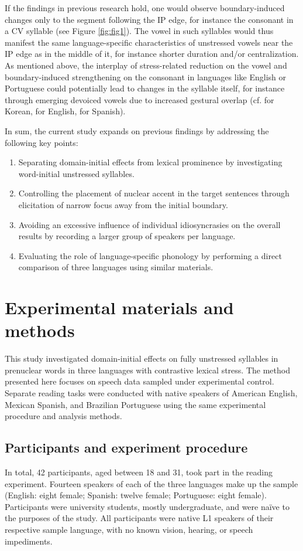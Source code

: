 \documentclass[output=paper]{langscibook}
\begin{document}
If the findings in previous research hold, one would observe boundary-induced changes only to the segment following the IP edge, for instance the consonant in a CV syllable (see Figure \ref{fig:fig1}). The vowel in such syllables would thus manifest the same language-specific characteristics of unstressed vowels near the IP edge as in the middle of it, for instance shorter duration and/or centralization. As mentioned above, the interplay of stress-related reduction on the vowel and boundary-induced strengthening on the consonant in languages like English or Portuguese could potentially lead to changes in the syllable itself, for instance through emerging devoiced vowels due to increased gestural overlap (cf. \citealt{jb94, m07} for Korean, \citealt{d06} for English, \citealt{d08} for Spanish).

In sum, the current study expands on previous findings by addressing the following key points:

\begin{enumerate}\sloppy
  \item Separating domain-initial effects from lexical prominence by investigating word-initial unstressed syllables.
  \item Controlling the placement of nuclear accent in the target sentences through elicitation of narrow focus away from the initial boundary.
  \item Avoiding an excessive influence of individual idiosyncrasies on the overall results by recording a larger group of speakers per language.
  \item Evaluating the role of language-specific phonology by performing a direct comparison of three languages using similar materials.
\end{enumerate}


\section{Experimental materials and methods }

This study investigated domain-initial effects on fully unstressed syllables in prenuclear words in three languages with contrastive lexical stress. The method presented here focuses on speech data sampled under experimental control. Separate reading tasks were conducted with native speakers of American English, Mexican Spanish, and Brazilian Portuguese using the same experimental procedure and analysis methods. 

\subsection{Participants and experiment procedure}
In total, 42 participants, aged between 18 and 31, took part in the reading experiment. Fourteen speakers of each of the three languages make up the sample (English: eight female; Spanish: twelve female; Portuguese: eight female). Participants were university students, mostly undergraduate, and were naïve to the purposes of the study. All participants were native L1 speakers of their respective sample language, with no known vision, hearing, or speech impediments. 
\end{document}
